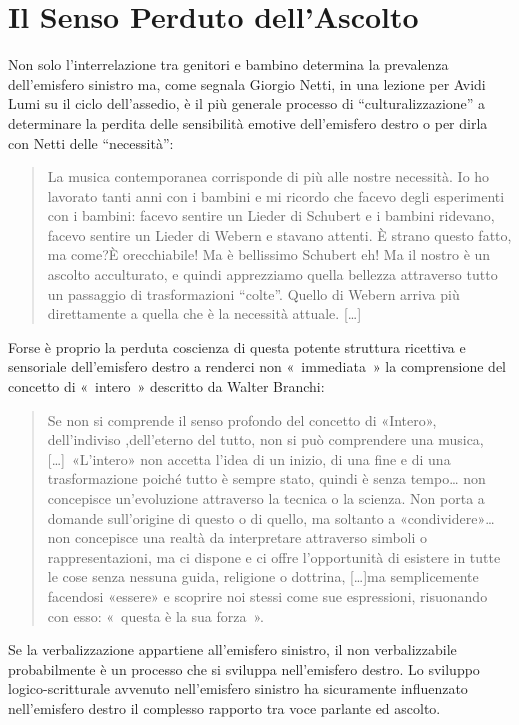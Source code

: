 \section{Il Senso Perduto dell’Ascolto}

Non solo l’interrelazione tra genitori e bambino determina  la prevalenza
dell’emisfero sinistro ma, come segnala  Giorgio Netti, in una lezione per
Avidi Lumi su  il ciclo dell'assedio, è il più generale processo di
“culturalizzazione” a determinare   la perdita delle sensibilità emotive
dell’emisfero destro o per dirla con Netti delle “necessità”:

\begin{quote}
La musica contemporanea corrisponde di più alle nostre necessità. Io ho
lavorato tanti anni con i bambini e mi ricordo  che facevo degli esperimenti
con i bambini: facevo sentire un Lieder di  Schubert e i bambini  ridevano,
facevo sentire un Lieder di Webern  e stavano attenti. È strano questo fatto, ma
come?È orecchiabile! Ma è bellissimo Schubert eh! Ma il nostro è un ascolto
acculturato, e quindi apprezziamo quella bellezza attraverso tutto un passaggio
di trasformazioni “colte”. Quello di Webern arriva più direttamente a quella che
è la necessità  attuale. [\ldots]
\end{quote}

Forse è proprio  la perduta coscienza di questa potente struttura ricettiva e
sensoriale dell’emisfero destro  a renderci non « immediata » la comprensione
del concetto di « intero »  descritto da Walter Branchi:

\begin{quote}
Se non si comprende il senso profondo del concetto di «Intero», dell’indiviso ,dell’eterno del tutto, non si può comprendere una musica,[\ldots] «L’intero»
non accetta l’idea di un inizio, di una fine e di una trasformazione poiché
tutto è sempre stato, quindi è senza tempo… non concepisce un’evoluzione
attraverso la tecnica o la scienza. Non porta a domande sull’origine di questo
o di quello, ma soltanto a «condividere»… non concepisce una realtà da
interpretare attraverso simboli o rappresentazioni, ma ci dispone e ci offre
l’opportunità di esistere  in tutte le cose senza nessuna guida, religione o
dottrina, [\ldots]ma semplicemente facendosi «essere» e scoprire noi stessi
come sue espressioni, risuonando con esso: « questa è la sua forza ».
\end{quote}

Se la verbalizzazione appartiene all’emisfero sinistro, il non verbalizzabile
probabilmente è un processo che  si sviluppa nell’emisfero destro. Lo sviluppo
logico-scritturale avvenuto  nell’emisfero sinistro ha sicuramente influenzato
nell’emisfero destro il complesso rapporto  tra  voce parlante ed ascolto.

